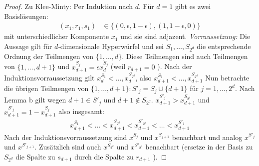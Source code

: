 \begin{proof}
Zu Klee-Minty:
Per Induktion nach $d$. Für $d=1$ gibt es zwei Basislösungen:
\begin{align*}
(x_1,r_1, s_1) &\in \{ (0,\epsilon, 1-\epsilon) , (1,1-\epsilon,0) \}
\end{align*}
mit unterschiedlicher Komponente $x_1$ und sie sind adjazent.
\emph{Vorraussetzung:} Die Aussage gilt für $d$-dimensionale Hyperwürfel und sei $S_1 ,\dotsc, S_{2^d}$ die entsprechende Ordnung der Teilmengen von $\{1,\dotsc, d\}$.
Diese Teilmengen sind auch Teilmengen von $\{1, \dotsc, d+1\}$ und $x^{S_j}_{d+1} = \epsilon x^{S_j}_{d}$ (weil $r_{d+1} = 0$ ).
Nach der Induktionsvorraussetzung gilt $x^{S_1}_d < \dotsc , x^{S_{2^d}}_{d}$, also $x^{S_1}_{d+1} < \dotsc , x^{S_{2^d}}_{d+1}$
Nun betrachte die übrigen Teilmengen von $\{1,\dotsc, d+1\}: S'_j = S_j \cup \{d+1\}$ für $j=1,\dotsc,2^d$.
Nach Lemma b gilt wegen $d+1 \in S'_j$ und $d+1 \notin S_{2^d}$.
$x^{S'_j}_{d+1} > x^{S_{2^d}}_{d+1}$ und $x^{S'_j}_{d+1} = 1 - x^{S_j}_{d+1}$ also insgesamt: 
\begin{align*}
x^{S_1}_{d+1} < \dotsc < x^{S_{2^d}}_{d+1} < x^{S'_{2^d}}_{d+1} < \dotsc < x^{S'_1}_{d+1}
\end{align*}
Nach der Induktionsvorraussetzung sind $x^{S_j}$ und $x^{S_{j+1}}$ benachbart und analog $x^{S'_j}$ und $x^{S'_{j+1}}$.
Zusätzlich sind auch $x^{S_{2^d}}$ und $x^{S'_{2^d}}$ benachbart (ersetze in der Basis zu $S_{2^d}$ die Spalte zu $s_{d+1}$ durch die Spalte zu $r_{d+1}$ ).
\end{proof}



